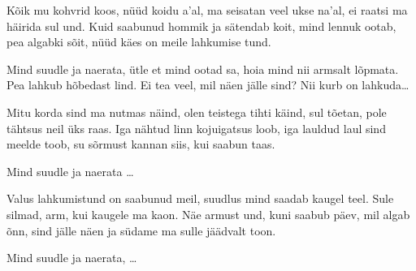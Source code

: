 K\~oik mu kohvrid koos, n\"u\"ud koidu a'al,
ma seisatan veel ukse na'al,
ei raatsi ma h\"airida sul und.
Kuid saabunud hommik ja s\"atendab koit,
mind lennuk ootab, pea algabki s\~oit,
n\"u\"ud k\"aes on meile lahkumise tund.

Mind suudle ja naerata,
\"utle et mind ootad sa,
hoia mind nii armsalt l\~opmata.
Pea lahkub h\~obedast lind.
Ei tea veel, mil n\"aen j\"alle sind?
Nii kurb on lahkuda\ldots

Mitu korda sind ma nutmas n\"aind,
olen teistega tihti k\"aind,
sul t\~oetan, pole t\"ahtsus neil \"uks raas.
Iga n\"ahtud linn kojuigatsus loob,
iga lauldud laul sind meelde toob,
su s\~ormust kannan siis, kui saabun taas.

Mind suudle ja naerata \ldots

Valus lahkumistund on saabunud meil,
suudlus mind saadab kaugel teel.
Sule silmad, arm, kui kaugele ma kaon.
N\"ae armust und, kuni saabub p\"aev,
mil algab \~onn, sind j\"alle n\"aen
ja s\"udame ma sulle j\"a\"advalt toon.

Mind suudle ja naerata, \ldots
